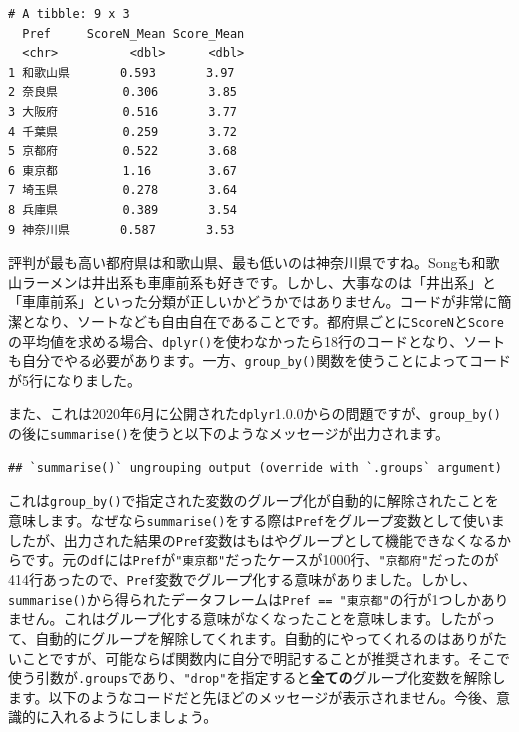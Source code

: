 \documentclass[
  a4paper,
  pandoc,
  ja=standard,
  jafont=haranoaji]{bxjsbook}
\begin{document}
\begin{verbatim}
# A tibble: 9 x 3
  Pref     ScoreN_Mean Score_Mean
  <chr>          <dbl>      <dbl>
1 和歌山県       0.593       3.97
2 奈良県         0.306       3.85
3 大阪府         0.516       3.77
4 千葉県         0.259       3.72
5 京都府         0.522       3.68
6 東京都         1.16        3.67
7 埼玉県         0.278       3.64
8 兵庫県         0.389       3.54
9 神奈川県       0.587       3.53
\end{verbatim}

評判が最も高い都府県は和歌山県、最も低いのは神奈川県ですね。Songも和歌山ラーメンは井出系も車庫前系も好きです。しかし、大事なのは「井出系」と「車庫前系」といった分類が正しいかどうかではありません。コードが非常に簡潔となり、ソートなども自由自在であることです。都府県ごとに\texttt{ScoreN}と\texttt{Score}の平均値を求める場合、\texttt{dplyr()}を使わなかったら18行のコードとなり、ソートも自分でやる必要があります。一方、\texttt{group\_by()}関数を使うことによってコードが5行になりました。

また、これは2020年6月に公開された\texttt{dplyr}1.0.0からの問題ですが、\texttt{group\_by()}の後に\texttt{summarise()}を使うと以下のようなメッセージが出力されます。

\begin{verbatim}
## `summarise()` ungrouping output (override with `.groups` argument)
\end{verbatim}

これは\texttt{group\_by()}で指定された変数のグループ化が自動的に解除されたことを意味します。なぜなら\texttt{summarise()}をする際は\texttt{Pref}をグループ変数として使いましたが、出力された結果の\texttt{Pref}変数はもはやグループとして機能できなくなるからです。元の\texttt{df}には\texttt{Pref}が\texttt{"東京都"}だったケースが1000行、\texttt{"京都府"}だったのが414行あったので、\texttt{Pref}変数でグループ化する意味がありました。しかし、\texttt{summarise()}から得られたデータフレームは\texttt{Pref\ ==\ "東京都"}の行が1つしかありません。これはグループ化する意味がなくなったことを意味します。したがって、自動的にグループを解除してくれます。自動的にやってくれるのはありがたいことですが、可能ならば関数内に自分で明記することが推奨されます。そこで使う引数が\texttt{.groups}であり、\texttt{"drop"}を指定すると\textbf{全ての}グループ化変数を解除します。以下のようなコードだと先ほどのメッセージが表示されません。今後、意識的に入れるようにしましょう。
\end{document}
